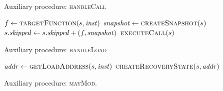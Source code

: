 
\begin{algorithm}
  \caption{Auxiliary procedure: \textsc{handleCall}
  \label{fig:aux-func-recS}}
\begin{algorithmic}[1]

\State $f \gets  \Call{targetFunction}{\workstate, \inst}$ \label{alg:call-find-target}
  \State $\snapshot \gets \Call{createSnapshot}{\workstate}$ \label{alg:take-snapshot}
  \State $s.\mathit{skipped} \gets s.\mathit{skipped} + (f,\mathit{snapshot})$ \label{alg:record-snapshot}
\Else
  \State $\Call{executeCall}{\workstate}$ \label{alg:call-normal}
\EndIf
\EndFunction
\end{algorithmic}
\end{algorithm}

\begin{algorithm}
  \caption{Auxiliary procedure: \textsc{handleLoad}
  \label{fig:aux-func-recS}}
\begin{algorithmic}[1]

\State $\addr \gets \Call{getLoadAddress}{\workstate, \inst}$
  \State $\Call{createRecoveryState}{\workstate,\addr}$ \label{alg:call-recover}
\Else
  \State {}  \label{alg:load-normal}
\EndIf
\EndFunction
\end{algorithmic}
\end{algorithm}

\begin{algorithm}
  \caption{Auxiliary procedure: \textsc{mayMod}.
  \label{fig:aux-func-may-mod}}
\begin{algorithmic}[1]


     \label{alg:maymod-static}
       \label{alg:maymod-dynamic}
         \State {}
       \EndIf
    \EndIf
  \EndFor
  \State {}
\EndFunction

\end{algorithmic}
\end{algorithm}

